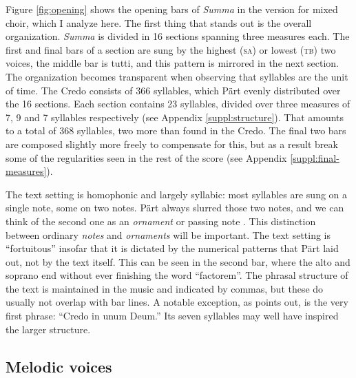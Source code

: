 \documentclass{interact}
\let\footnote=\endnote
\begin{document}
Figure \ref{fig:opening} shows the opening bars of \emph{Summa} in the version for mixed choir, which I analyze here.%
\footnote{
    UE 33 686, Korr.~III/2012, to be precise.
}
The first thing that stands out is the overall organization.
\emph{Summa} is divided in 16 sections spanning three measures each.
The first and final bars of a section are sung by the highest (\textsc{sa}) or lowest (\textsc{tb}) two voices, the middle bar is tutti, and this pattern is mirrored in the next section.
The organization becomes transparent when observing that syllables are the unit of time.
The Credo consists of 366 syllables, which Pärt evenly distributed over the 16 sections.
Each section contains 23 syllables, divided over three measures of 7, 9 and 7 syllables respectively (see Appendix \ref{suppl:structure}).
That amounts to a total of 368 syllables, two more than found in the Credo.
The final two bars are composed slightly more freely to 
compensate for this, but as a result break some of the regularities seen in the rest of the score (see Appendix \ref{suppl:final-measures}).


The text setting is homophonic and largely syllabic: most syllables are sung on a single note, some on two notes.
Pärt always slurred those two notes, and we can think of the second one as an \emph{ornament} or passing note \parencite[cf.][]{Hillier1997}.
This distinction between ordinary \emph{notes} and \emph{ornaments} will be important.
The text setting is ``fortuitous'' \parencite{Hillier1997} insofar that it is dictated by the numerical patterns that Pärt laid out, not by the text itself. 
This can be seen in the second bar, where the alto and soprano end without ever finishing the word ``factorem''.
The phrasal structure of the text is maintained in the music and indicated by commas, but these do usually not overlap with bar lines.
A notable exception, as \textcite{Hillier1997} points out, is the very first phrase: ``Credo in unum Deum.''
Its seven syllables may well have inspired the larger structure.


\subsection{Melodic voices}
\end{document}
